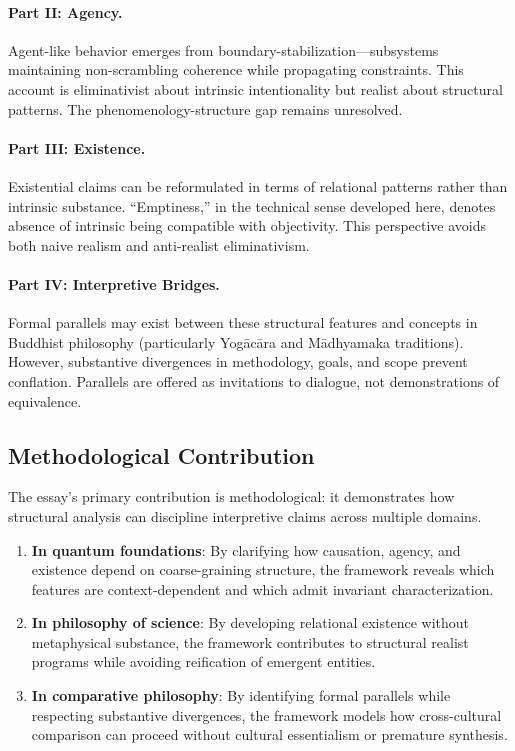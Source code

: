 \documentclass[11pt,a4paper]{article}
\begin{document}
\paragraph{Part II: Agency.}
Agent-like behavior emerges from boundary-stabilization—subsystems maintaining non-scrambling coherence while propagating constraints. This account is eliminativist about intrinsic intentionality but realist about structural patterns. The phenomenology-structure gap remains unresolved.

\paragraph{Part III: Existence.}
Existential claims can be reformulated in terms of relational patterns rather than intrinsic substance. ``Emptiness,'' in the technical sense developed here, denotes absence of intrinsic being compatible with objectivity. This perspective avoids both naive realism and anti-realist eliminativism.

\paragraph{Part IV: Interpretive Bridges.}
Formal parallels may exist between these structural features and concepts in Buddhist philosophy (particularly Yog\=ac\=ara and M\=adhyamaka traditions). However, substantive divergences in methodology, goals, and scope prevent conflation. Parallels are offered as invitations to dialogue, not demonstrations of equivalence.

\subsection{Methodological Contribution}

The essay's primary contribution is methodological: it demonstrates how structural analysis can discipline interpretive claims across multiple domains.

\begin{enumerate}
\item \textbf{In quantum foundations}: By clarifying how causation, agency, and existence depend on coarse-graining structure, the framework reveals which features are context-dependent and which admit invariant characterization.

\item \textbf{In philosophy of science}: By developing relational existence without metaphysical substance, the framework contributes to structural realist programs while avoiding reification of emergent entities.

\item \textbf{In comparative philosophy}: By identifying formal parallels while respecting substantive divergences, the framework models how cross-cultural comparison can proceed without cultural essentialism or premature synthesis.
\end{enumerate}
\end{document}
